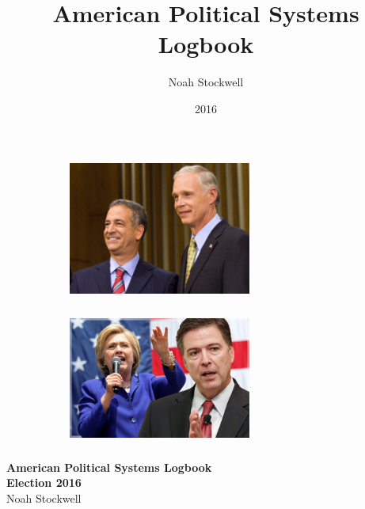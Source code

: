\documentclass[twoside]{article}
\title{American Political Systems Logbook}
\author{Noah Stockwell}
\date{2016}
\begin{document}
\begin{titlepage}
  \centering
  \centering
  \begin{figure}[H]
    \centering
    \begin{subfigure}{.4\textwidth}
      \centering
      \includegraphics[width=6cm,height=4.5cm,keepaspectratio]{images/frontpage/Senate.jpg}
      \end{subfigure}%
      \begin{subfigure}{.4\textwidth}
        \centering
        \includegraphics[width=6cm,height=4.5cm,keepaspectratio]{images/frontpage/Comey.jpg}
        \end{subfigure}%
        \centering
        \vskip3cm
      \end{figure}
      {\bfseries\huge American Political Systems Logbook\\}
      \vskip1cm
      {\bfseries\LARGE Election 2016\\}
      \vskip2cm
      {\huge Noah Stockwell\\}


\end{titlepage}
\end{document}
